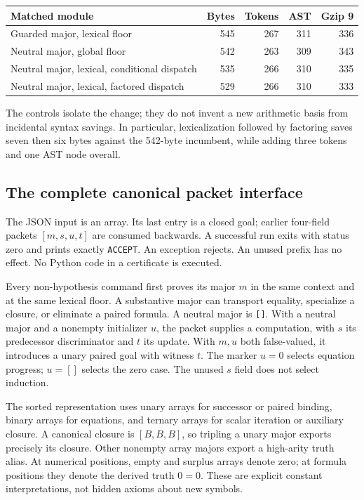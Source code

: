 \begin{center}\small
\begin{tabular}{@{}lrrrr@{}}
\toprule
Matched module & Bytes & Tokens & AST & Gzip 9\\\midrule
Guarded major, lexical floor & 545 & 267 & 311 & 336\\
Neutral major, global floor & 542 & 263 & 309 & 343\\
Neutral major, lexical, conditional dispatch & 535 & 266 & 310 & 335\\
Neutral major, lexical, factored dispatch & 529 & 266 & 310 & 333\\
\bottomrule
\end{tabular}
\end{center}

The controls isolate the change; they do not invent a new arithmetic basis
from incidental syntax savings. In particular, lexicalization followed by
factoring saves seven then six bytes against the 542-byte incumbent, while
adding three tokens and one AST node overall.

\subsection{The complete canonical packet interface}

The JSON input is an array. Its last entry is a closed goal; earlier
four-field packets $[m,s,u,t]$ are consumed backwards. A successful run
exits with status zero and prints exactly \texttt{ACCEPT}. An exception
rejects. An unused prefix has no effect. No Python code in a certificate
is executed.

Every non-hypothesis command first proves its major $m$ in the same context
and at the same lexical floor. A substantive major can transport equality,
specialize a closure, or eliminate a paired formula. A neutral major is
\texttt{[]}. With a neutral major and a nonempty initializer $u$, the
packet supplies a computation, with $s$ its predecessor discriminator and
$t$ its update. With $m,u$ both false-valued, it introduces a unary paired
goal with witness $t$. The marker $u=0$ selects equation progress; $u=[]$
selects the zero case. The unused $s$ field does not select induction.

The sorted representation uses unary arrays for successor or paired
binding, binary arrays for equations, and ternary arrays for scalar
iteration or auxiliary closure. A canonical closure is $[B,B,B]$, so
tripling a unary major exports precisely its closure. Other nonempty
array majors export a high-arity truth alias. At numerical positions,
empty and surplus arrays denote zero; at formula positions they denote
the derived truth $0=0$. These are explicit constant interpretations,
not hidden axioms about new symbols.


